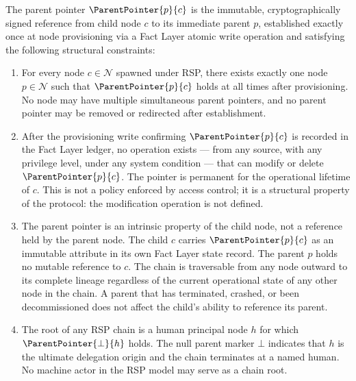 \begin{dfn}
\label{dfn:parent-pointer}
The parent pointer $\ParentPointer{p}{c}$ is the immutable, cryptographically signed reference from child node $c$ to its immediate parent $p$, established exactly once at node provisioning via a Fact Layer atomic write operation and satisfying the following structural constraints:

\begin{enumerate}
    \item[(P1) \textbf{Uniqueness}] For every node $c \in \mathcal{N}$ spawned under RSP, there exists exactly one node $p \in \mathcal{N}$ such that $\ParentPointer{p}{c}$ holds at all times after provisioning. No node may have multiple simultaneous parent pointers, and no parent pointer may be removed or redirected after establishment.

    \item[(P2) \textbf{Immutability}] After the provisioning write confirming $\ParentPointer{p}{c}$ is recorded in the Fact Layer ledger, no operation exists --- from any source, with any privilege level, under any system condition --- that can modify or delete $\ParentPointer{p}{c}$. The pointer is permanent for the operational lifetime of $c$. This is not a policy enforced by access control; it is a structural property of the protocol: the modification operation is not defined.

    \item[(P3) \textbf{Directionality}] The parent pointer is an intrinsic property of the child node, not a reference held by the parent node. The child $c$ carries $\ParentPointer{p}{c}$ as an immutable attribute in its own Fact Layer state record. The parent $p$ holds no mutable reference to $c$. The chain is traversable from any node outward to its complete lineage regardless of the current operational state of any other node in the chain. A parent that has terminated, crashed, or been decommissioned does not affect the child's ability to reference its parent.

    \item[(P4) \textbf{Termination at Human Anchor}] The root of any RSP chain is a human principal node $h$ for which $\ParentPointer{\bot}{h}$ holds. The null parent marker $\bot$ indicates that $h$ is the ultimate delegation origin and the chain terminates at a named human. No machine actor in the RSP model may serve as a chain root.
\end{enumerate}
\end{dfn}

